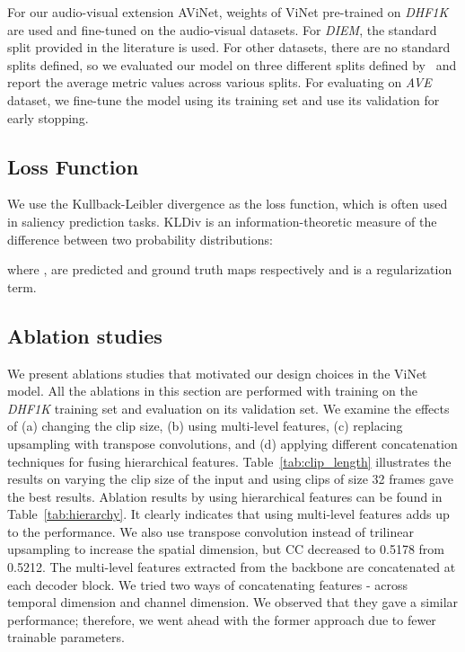 \documentclass[letterpaper, 10 pt, conference]{ieeeconf}  \usepackage{times}
\begin{document}
For our audio-visual extension AViNet, weights of ViNet pre-trained on \emph{DHF1K} are used and fine-tuned on the audio-visual datasets. For \emph{DIEM}, the standard split provided in the literature is used. For other datasets, there are no standard splits defined, so we evaluated our model on three different splits defined by~\cite{tsiami2020stavis} and report the average metric values across various splits. For evaluating on \emph{AVE} dataset, we fine-tune the model using its training set and use its validation for early stopping.


\subsection{Loss Function}
We use the Kullback-Leibler divergence as the loss function, which is often used in saliency prediction tasks. KLDiv is an information-theoretic measure of the difference between two probability distributions:

where ,  are predicted and ground truth maps respectively and  is a regularization term.

\subsection{Ablation studies}

We present ablations studies that motivated our design choices in the ViNet model. All the ablations in this section are performed with training on the \emph{DHF1K} training set and evaluation on its validation set. We examine the effects of (a) changing the clip size, (b) using multi-level features, (c) replacing upsampling with transpose convolutions, and (d) applying different concatenation techniques for fusing hierarchical features.  Table~\ref{tab:clip_length} illustrates the results on varying the clip size of the input and using clips of size 32 frames gave the best results.  Ablation results by using hierarchical features can be found in Table~\ref{tab:hierarchy}. It clearly indicates that using multi-level features adds up to the performance. We also use transpose convolution instead of trilinear upsampling to increase the spatial dimension, but CC decreased to 0.5178 from 0.5212. The multi-level features extracted from the backbone are concatenated at each decoder block. We tried two ways of concatenating features - across temporal dimension and channel dimension. We observed that they gave a similar performance; therefore, we went ahead with the former approach due to fewer trainable parameters. 
\end{document}
